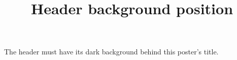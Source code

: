 \documentclass[paper=A4]{ropas-poster}
\title{Header background position}
\begin{document}
The header must have its dark background behind this poster's title.
\end{document}
